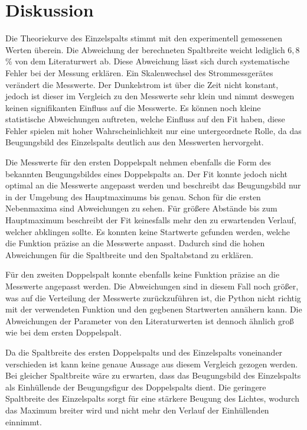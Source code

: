 \section{Diskussion}
\label{sec:Diskussion}

Die Theoriekurve des Einzelspalts stimmt mit den experimentell gemessenen Werten überein. Die Abweichung der berechneten Spaltbreite weicht lediglich
$6,8\,$\% von dem Literaturwert ab. Diese Abweichung lässt sich durch systematische Fehler bei der Messung erklären. Ein Skalenwechsel des
Strommessgerätes verändert die Messwerte. Der Dunkelstrom ist über die Zeit nicht konstant, jedoch ist dieser im Vergleich zu
den Messwerte sehr klein und nimmt deswegen keinen signifikanten Einfluss auf die Messwerte. Es können noch kleine
statistische Abweichungen auftreten, welche Einfluss auf den Fit haben, diese Fehler spielen mit hoher Wahrscheinlichkeit nur eine untergeordnete
Rolle, da das Beugungsbild des Einzelspalts deutlich aus den Messwerten hervorgeht.

Die Messwerte für den ersten Doppelspalt nehmen ebenfalls die Form des bekannten Beugungsbildes eines Doppelspalts an. Der Fit konnte jedoch nicht
optimal an die Messwerte angepasst werden und beschreibt das Beugungsbild nur in der Umgebung des Hauptmaximums bis genau. Schon für
die ersten Nebenmaxima sind Abweichungen zu sehen. Für größere Abstände bis zum Hauptmaximum beschreibt der Fit keinesfalls mehr den zu erwartenden Verlauf, welcher
abklingen sollte. Es konnten keine Startwerte gefunden werden, welche die Funktion präzise an die Messwerte anpasst.
Dadurch sind die hohen Abweichungen für die Spaltbreite und den Spaltabstand zu erklären.

Für den zweiten Doppelspalt konnte ebenfalls keine Funktion präzise an die Messwerte angepasst werden. Die Abweichungen sind in diesem Fall noch größer,
was auf die Verteilung der Messwerte zurückzuführen ist, die Python nicht richtig mit der verwendeten Funktion und den
gegbenen Startwerten annähern kann.
Die Abweichungen der Parameter von den Literaturwerten ist dennoch ähnlich groß wie bei dem ersten Doppelspalt.


Da die Spaltbreite des ersten Doppelspalts und des Einzelspalts voneinander verschieden ist kann keine genaue Aussage aus diesem Vergleich gezogen werden.
Bei gleicher Spaltbreite wäre zu erwarten, dass das Beugungsbild des Einzelspalts als Einhüllende der Beugungsfigur des Doppelspalts dient.
Die geringere Spaltbreite des Einzelspalts sorgt für eine stärkere Beugung des Lichtes, wodurch das Maximum breiter  wird und nicht mehr den
Verlauf der Einhüllenden einnimmt.
